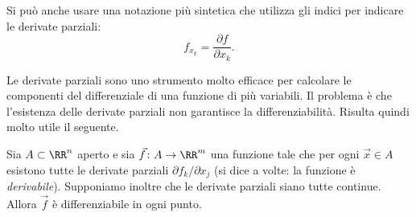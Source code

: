 Si può anche usare una notazione più sintetica che utilizza 
gli indici per indicare le derivate parziali:
\[
   f_{x_k} = \frac{\partial f}{\partial x_k}.
\]

Le derivate parziali sono uno strumento molto 
efficace per calcolare le componenti del differenziale 
di una funzione di più variabili.
Il problema è che l'esistenza delle derivate parziali 
non garantisce la differenziabilità.
Risulta quindi molto utile il seguente.

\begin{theorem}
Sia $A\subset \RR^n$ aperto 
e sia $\vec f\colon A \to \RR^m$ una funzione 
tale che per ogni $\vec x\in A$ esistono 
tutte le derivate parziali $\partial f_k/\partial x_j$
(si dice a volte: la funzione è \emph{derivabile}).
Supponiamo inoltre che le derivate parziali siano 
tutte continue.
Allora $\vec f$ è differenziabile in ogni punto. 
\end{theorem}
